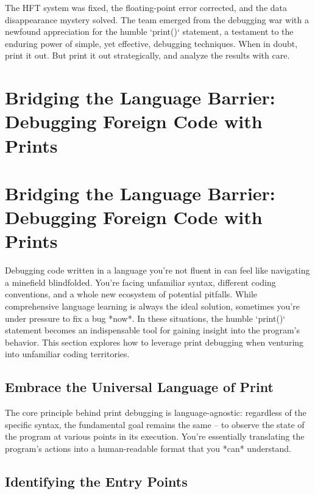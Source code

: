 \documentclass{article}
\begin{document}
{{{{The HFT system was fixed, the floating-point error corrected, and the data disappearance mystery solved. The team emerged from the debugging war with a newfound appreciation for the humble `print()` statement, a testament to the enduring power of simple, yet effective, debugging techniques. When in doubt, print it out. But print it out strategically, and analyze the results with care.

\newpage

\section*{Bridging the Language Barrier: Debugging Foreign Code with Prints} %
\label{chapter-8-8-Bridging_the_Language_Barrier__Debugging}

\section*{Bridging the Language Barrier: Debugging Foreign Code with Prints}

Debugging code written in a language you're not fluent in can feel like navigating a minefield blindfolded. You're facing unfamiliar syntax, different coding conventions, and a whole new ecosystem of potential pitfalls. While comprehensive language learning is always the ideal solution, sometimes you're under pressure to fix a bug *now*. In these situations, the humble `print()` statement becomes an indispensable tool for gaining insight into the program's behavior. This section explores how to leverage print debugging when venturing into unfamiliar coding territories.

\subsection*{Embrace the Universal Language of Print}

The core principle behind print debugging is language-agnostic: regardless of the specific syntax, the fundamental goal remains the same – to observe the state of the program at various points in its execution. You're essentially translating the program's actions into a human-readable format that you *can* understand.

\subsection*{Identifying the Entry Points}

}}}}
\end{document}
